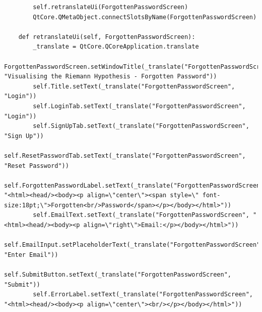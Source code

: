 \documentclass[12pt]{article}
\begin{document}
\begin{lstlisting}
        self.retranslateUi(ForgottenPasswordScreen)
        QtCore.QMetaObject.connectSlotsByName(ForgottenPasswordScreen)

    def retranslateUi(self, ForgottenPasswordScreen):
        _translate = QtCore.QCoreApplication.translate
        ForgottenPasswordScreen.setWindowTitle(_translate("ForgottenPasswordScreen", "Visualising the Riemann Hypothesis - Forgotten Password"))
        self.Title.setText(_translate("ForgottenPasswordScreen", "Login"))
        self.LoginTab.setText(_translate("ForgottenPasswordScreen", "Login"))
        self.SignUpTab.setText(_translate("ForgottenPasswordScreen", "Sign Up"))
        self.ResetPasswordTab.setText(_translate("ForgottenPasswordScreen", "Reset Password"))
        self.ForgottenPasswordLabel.setText(_translate("ForgottenPasswordScreen", "<html><head/><body><p align=\"center\"><span style=\" font-size:18pt;\">Forgotten<br/>Password</span></p></body></html>"))
        self.EmailText.setText(_translate("ForgottenPasswordScreen", "<html><head/><body><p align=\"right\">Email:</p></body></html>"))
        self.EmailInput.setPlaceholderText(_translate("ForgottenPasswordScreen", "Enter Email"))
        self.SubmitButton.setText(_translate("ForgottenPasswordScreen", "Submit"))
        self.ErrorLabel.setText(_translate("ForgottenPasswordScreen", "<html><head/><body><p align=\"center\"><br/></p></body></html>"))
\end{lstlisting}
\end{document}
